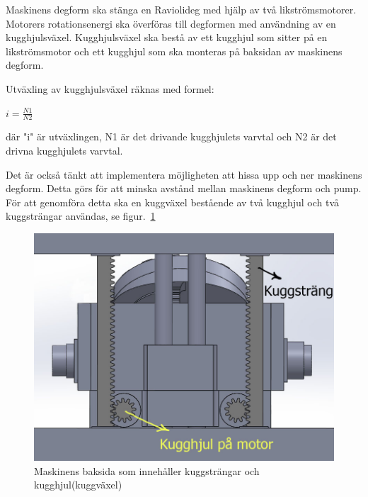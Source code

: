 Maskinens degform ska stänga en Raviolideg med hjälp av två likströmsmotorer. Motorers rotationsenergi ska överföras till degformen med användning av en kugghjulsväxel. Kugghjulsväxel ska bestå av ett kugghjul som sitter på en likströmsmotor och ett kugghjul som ska monteras på baksidan av maskinens degform.

Utväxling av kugghjulsväxel räknas med formel:
\begin{center}
\LARGE \textbf{	$ i = \frac{N1}{N2}$}
\end{center}
där "i" är utväxlingen, N1 är det drivande kugghjulets varvtal och N2 är det drivna kugghjulets varvtal. 

Det är också tänkt att implementera möjligheten att hissa upp och ner maskinens degform. Detta görs för att minska avstånd mellan maskinens degform och pump. För att genomföra detta ska en kuggväxel bestående av två kugghjul och två kuggsträngar användas, se figur.~\ref{maskinens_baksida_metod}

\begin{figure}[ht]
	\begin{center}
		\includegraphics[scale=0.8]{images/maskinBaksida.jpg}
		\caption{Maskinens baksida som innehåller kuggsträngar och kugghjul(kuggväxel)}
		\label{maskinens_baksida_metod}	
	\end{center}
\end{figure}
